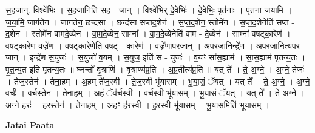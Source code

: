 \documentclass[17pt]{extarticle}
\begin{document}
स॒ह॒जान्. विश्वे॑भिः । स॒ह॒जानिति॑ सह - जान् । विश्वे॑भिर् दे॒वेभिः॑ । दे॒वेभिः॒ पृत॑नाः । पृत॑ना जयामि । ज॒या॒मि॒ जाग॑तेन । जाग॑तेन॒ छन्द॑सा । छन्द॑सा सप्तद॒शेन॑ । स॒प्त॒द॒शेन॒ स्तोमे॑न । स॒प्त॒द॒शेनेति॑ सप्त - द॒शेन॑ । स्तोमे॑न वामदे॒व्येन॑ । वा॒म॒दे॒व्येन॒ साम्ना᳚ । वा॒म॒दे॒व्येनेति॑ वाम - दे॒व्येन॑ । साम्ना॑ वषट्का॒रेण॑ । व॒ष॒ट्का॒रेण॒ वज्रे॑ण । व॒ष॒ट्का॒रेणेति॑ वषट् - का॒रेण॑ । वज्रे॑णापर॒जान् । अ॒प॒र॒जानिन्द्रे॑ण । अ॒प॒र॒जानित्य॑पर - जान् । इन्द्रे॑ण स॒युजः॑ । स॒युजो॑ व॒यम् । स॒युज॒ इति॑ स - युजः॑ । व॒यꣳ सा॑स॒ह्याम॑ । सा॒स॒ह्याम॑ पृतन्य॒तः । पृ॒त॒न्य॒त इति॑ पृतन्य॒तः ॥ घ्नन्तो॑ वृ॒त्राणि॑ । वृ॒त्राण्य॑प्र॒ति । अ॒प्र॒तीत्य॑प्र॒ति ॥ यत् ते᳚ । ते॒ अ॒ग्ने॒ । अ॒ग्ने॒ तेजः॑ । तेज॒स्तेन॑ । तेना॒हम् । अ॒हम् ते॑ज॒स्वी । ते॒ज॒स्वी भू॑यासम् । भू॒या॒सं॒ ॅयत् । यत् ते᳚ । ते॒ अ॒ग्ने॒ । अ॒ग्ने॒ वर्चः॑ । वर्च॒स्तेन॑ । तेना॒हम् । अ॒हं ॅव॑र्च॒स्वी । व॒र्च॒स्वी भू॑यासम् । भू॒या॒सं॒ ॅयत् । यत् ते᳚ । ते॒ अ॒ग्ने॒ । अ॒ग्ने॒ हरः॑ । हर॒स्तेन॑ । तेना॒हम् । अ॒हꣳ ह॑र॒स्वी । ह॒र॒स्वी भू॑यासम् । भू॒या॒स॒मिति॑ भूयासम् । \newline

\textbf{Jatai Paata} \newline
\end{document}
